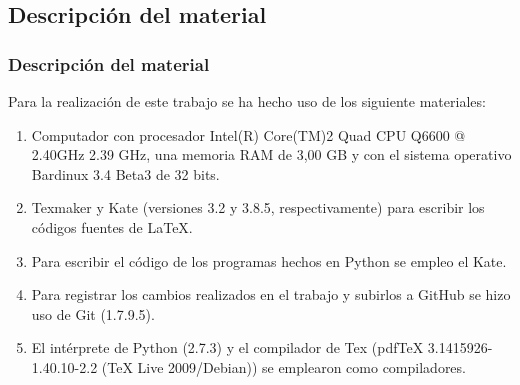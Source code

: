 \documentclass{beamer}
\begin{document}

\subsection{Descripción del material}
\begin{frame}
\frametitle{Descripción del material}
	Para la realización de este trabajo se ha hecho uso de los siguiente materiales:
	
  \begin{enumerate}
    \item
    Computador con procesador Intel(R) Core(TM)2 Quad CPU Q6600 @ 2.40GHz 2.39 GHz, 
una memoria RAM de 3,00 GB y con el sistema operativo Bardinux 3.4 Beta3 de 32 bits.
      \pause
    \item
    Texmaker y Kate (versiones 3.2 y 3.8.5, respectivamente) para escribir los códigos fuentes de LaTeX.
      \pause
    \item
    Para escribir el código de los programas hechos en Python se empleo el Kate.
      \pause
    \item 
    Para registrar los cambios realizados en el trabajo y subirlos a GitHub se hizo uso de Git (1.7.9.5).
      \pause
    \item
    El intérprete de Python (2.7.3) y el compilador de Tex (pdfTeX 3.1415926-1.40.10-2.2 (TeX Live 2009/Debian)) se emplearon como compiladores.   
  \end{enumerate}


\end{frame}
\end{document}
